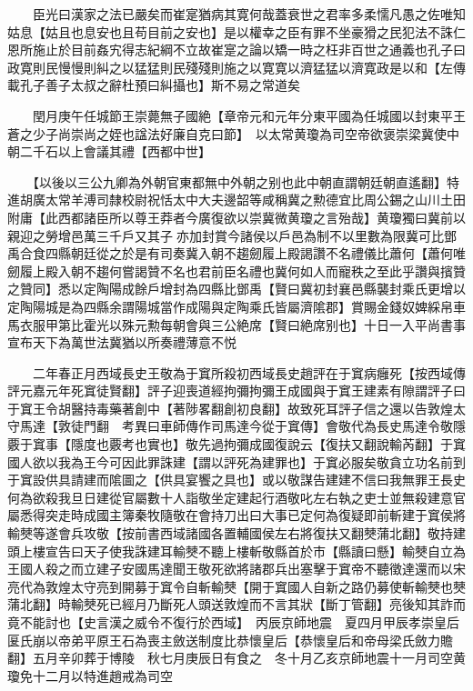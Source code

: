 　　臣光曰漢家之法已嚴矣而崔寔猶病其寛何哉蓋衰世之君率多柔懦凡愚之佐唯知姑息【姑且也息安也且苟目前之安也】是以權幸之臣有罪不坐豪猾之民犯法不誅仁恩所施止於目前姦宄得志紀綱不立故崔寔之論以矯一時之枉非百世之通義也孔子曰政寛則民慢慢則糾之以猛猛則民殘殘則施之以寛寛以濟猛猛以濟寛政是以和【左傳載孔子善子太叔之辭杜預曰糾攝也】斯不易之常道矣

　　閏月庚午任城節王崇薨無子國絶【章帝元和元年分東平國為任城國以封東平王蒼之少子尚崇尚之姪也諡法好廉自克曰節】　以太常黄瓊為司空帝欲褒崇梁冀使中朝二千石以上會議其禮【西都中世】

　　【以後以三公九卿為外朝官東都無中外朝之别也此中朝直謂朝廷朝直遙翻】特進胡廣太常羊溥司隸校尉祝恬太中大夫邊韶等咸稱冀之勲德宜比周公錫之山川土田附庸【此西都諸臣所以尊王莽者今廣復欲以崇冀微黄瓊之言殆哉】黄瓊獨曰冀前以親迎之勞增邑萬三千戶又其子亦加封賞今諸侯以戶邑為制不以里數為限冀可比鄧禹合食四縣朝廷從之於是有司奏冀入朝不趨劒履上殿謁讚不名禮儀比蕭何【蕭何唯劒履上殿入朝不趨何嘗謁贊不名也君前臣名禮也冀何如人而寵秩之至此乎讚與擯贊之贊同】悉以定陶陽成餘戶增封為四縣比鄧禹【賢曰冀初封襄邑縣襲封乘氏更增以定陶陽城是為四縣余謂陽城當作成陽與定陶乘氏皆屬濟隂郡】賞賜金錢奴婢綵帛車馬衣服甲第比霍光以殊元勲每朝會與三公絶席【賢曰絶席别也】十日一入平尚書事宣布天下為萬世法冀猶以所奏禮薄意不悦

　　二年春正月西域長史王敬為于窴所殺初西域長史趙評在于窴病癰死【按西域傳評元嘉元年死窴徒賢翻】評子迎喪道經拘彌拘彌王成國與于窴王建素有隙謂評子曰于窴王令胡醫持毒藥著創中【著陟畧翻創初良翻】故致死耳評子信之還以告敦煌太守馬達【敦徒門翻　考異曰車師傳作司馬達今從于窴傳】會敬代為長史馬達令敬隱覈于窴事【隱度也覈考也實也】敬先過拘彌成國復說云【復扶又翻說輸芮翻】于窴國人欲以我為王今可因此罪誅建【謂以評死為建罪也】于窴必服矣敬貪立功名前到于窴設供具請建而隂圖之【供具宴饗之具也】或以敬謀告建建不信曰我無罪王長史何為欲殺我旦日建從官屬數十人詣敬坐定建起行酒敬叱左右執之吏士並無殺建意官屬悉得突走時成國主簿秦牧隨敬在會持刀出曰大事已定何為復疑即前斬建于窴侯將輸僰等遂會兵攻敬【按前書西域諸國各置輔國侯左右將復扶又翻僰蒲北翻】敬持建頭上樓宣告曰天子使我誅建耳輸僰不聽上樓斬敬縣首於市【縣讀曰懸】輸僰自立為王國人殺之而立建子安國馬達聞王敬死欲將諸郡兵出塞擊于窴帝不聽徵達還而以宋亮代為敦煌太守亮到開募于窴令自斬輸僰【開于窴國人自新之路仍募使斬輸僰也僰蒲北翻】時輸僰死已經月乃斷死人頭送敦煌而不言其狀【斷丁管翻】亮後知其詐而竟不能討也【史言漢之威令不復行於西域】　丙辰京師地震　夏四月甲辰孝崇皇后匽氏崩以帝弟平原王石為喪主斂送制度比恭懷皇后【恭懷皇后和帝母梁氏斂力贍翻】五月辛卯葬于博陵　秋七月庚辰日有食之　冬十月乙亥京師地震十一月司空黄瓊免十二月以特進趙戒為司空

